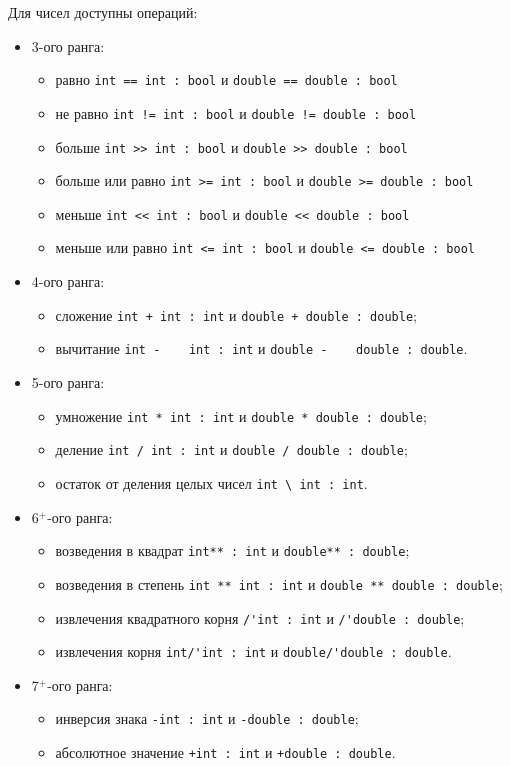 \documentclass[a4paper, 14pt]{extarticle}
\newenvironment{icItems}
	{ \begin{itemize} [noitemsep,nolistsep] }
	{ \end{itemize} }
\begin{document}
Для чисел доступны операций:
\begin{icItems}
	\item 3-ого ранга:
		\begin{icItems}
			\item равно \lstinline`int == int : bool` и \lstinline`double == double : bool`
			\item не равно \lstinline`int != int : bool` и \lstinline`double != double : bool`
			\item больше \lstinline`int >> int : bool` и \lstinline`double >> double : bool`
			\item больше или равно \lstinline`int >= int : bool` и \lstinline`double >= double : bool`
			\item меньше \lstinline`int << int : bool` и \lstinline`double << double : bool`
			\item меньше или равно \lstinline`int <= int : bool` и \lstinline`double <= double : bool`
		\end{icItems}
	\item 4-ого ранга:
		\begin{icItems}
			\item сложение \lstinline`int + int : int` и \lstinline`double + double : double`;
			\item вычитание \lstinline`int -    int : int` и \lstinline`double -    double : double`.
		\end{icItems}
	\item 5-ого ранга:
		\begin{icItems}
			\item умножение \lstinline`int * int : int` и \lstinline`double * double : double`;
			\item деление \lstinline`int / int : int` и \lstinline`double / double : double`;
			\item остаток от деления целых чисел \lstinline`int \ int : int`.
		\end{icItems}
	\item 6$^+$-ого ранга:
		\begin{icItems}
			\item возведения в квадрат \lstinline`int** : int` и \lstinline`double** : double`;
			\item возведения в степень \lstinline`int ** int : int` и \lstinline`double ** double : double`;
			\item извлечения квадратного корня \lstinline`/'int : int` и \lstinline`/'double : double`;
			\item извлечения корня \lstinline`int/'int : int` и \lstinline`double/'double : double`.
		\end{icItems}
	\item 7$^+$-ого ранга:
		\begin{icItems}
			\item инверсия знака \lstinline`-int : int` и \lstinline`-double : double`;
			\item абсолютное значение \lstinline`+int : int` и \lstinline`+double : double`.
		\end{icItems}
\end{icItems}
\end{document}
